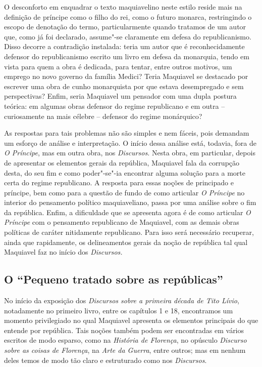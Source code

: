 O desconforto em enquadrar o texto maquiavelino neste estilo reside mais
na definição de príncipe como o filho do rei, como o futuro monarca,
restringindo o escopo de denotação do termo, particularmente quando
tratamos de um autor que, como já foi declarado, assume"-se claramente em
defesa do republicanismo. Disso decorre a contradição instalada: teria
um autor que é reconhecidamente defensor do republicanismo escrito um
livro em defesa da monarquia, tendo em vista para quem a obra é
dedicada, para tentar, entre outros motivos, um emprego no novo governo
da família Medici? Teria Maquiavel se destacado por escrever uma obra de
cunho monarquista por que estava desempregado e sem perspectivas? Enfim,
seria Maquiavel um pensador com uma dupla postura teórica: em algumas
obras defensor do regime republicano e em outra -- curiosamente na mais
célebre -- defensor do regime monárquico?

As respostas para tais problemas não são simples e nem fáceis, pois
demandam um esforço de análise e interpretação. O início dessa análise
está, todavia, fora de \emph{O Príncipe}, mas em outra obra, nos
\emph{Discursos.} Nesta obra, em particular, depois de apresentar os
elementos gerais da república, Maquiavel fala da corrupção desta, do seu
fim e como poder"-se"-ia encontrar alguma solução para a morte certa do
regime republicano. A resposta para essas noções de principado e
príncipe, bem como para a questão de fundo de como articular \emph{O
Príncipe} no interior do pensamento político maquiaveliano, passa por
uma análise sobre o fim da república. Enfim, a dificuldade que se
apresenta agora é de como articular \emph{O Príncipe} com o pensamento
republicano de Maquiavel, com as demais obras políticas de caráter
nitidamente republicano. Para isso será necessário recuperar, ainda que
rapidamente, os delineamentos gerais da noção de república tal qual
Maquiavel faz no início dos \emph{Discursos.}

\subsection{O ``Pequeno tratado sobre as repúblicas''}

No início da exposição dos \emph{Discursos sobre a primeira década de
Tito Lívio}, notadamente no primeiro livro, entre os capítulos 1 e 18,
encontramos um momento privilegiado no qual Maquiavel apresenta os
elementos principais do que entende por república\emph{.} Tais noções
também podem ser encontradas em vários escritos de modo esparso, como na
\emph{História de Florença}, no opúsculo \emph{Discurso sobre as coisas
de Florença}, na \emph{Arte da Guerra}, entre outros; mas em nenhum
deles temos de modo tão claro e estruturado como nos \emph{Discursos}.

